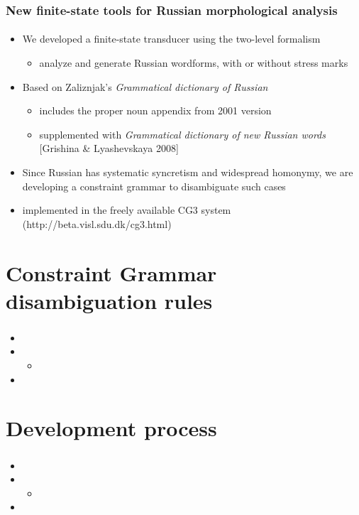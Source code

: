 \documentclass{beamer}
\begin{document}
\begin{frame}
\frametitle{New finite-state tools for Russian morphological analysis}
\framesubtitle{}
\begin{itemize}
	\item We developed a finite-state transducer using the two-level formalism \cite{Koskenniemi-84}
	\begin{itemize}	
		\item analyze and generate Russian wordforms, with or without stress marks
		\pause
	\end{itemize}
	\item Based on Zaliznjak's \emph{Grammatical dictionary of Russian} \cite{Zaliznjak-77}
	\begin{itemize}
		\item includes the proper noun appendix from 2001 version
		\item supplemented with \emph{Grammatical dictionary of new Russian words} [Grishina \& Lyashevskaya 2008]
		\pause
	\end{itemize}
	\item Since Russian has systematic syncretism and widespread homonymy, we are developing a constraint grammar \cite{Karlsson.Voutilainen.ea-95} to disambiguate such cases
	\pause
	\item implemented in the freely available CG3 system (http://beta.visl.sdu.dk/cg3.html)
\end{itemize}
\end{frame}

\section{Constraint Grammar disambiguation rules} %

\begin{frame}
\frametitle{}
\framesubtitle{}
\begin{itemize}
	\item 
	\pause
	\item 
	\begin{itemize}
		\item 
		\pause
	\end{itemize}
	\item 
\end{itemize}
\end{frame}


\section{Development process} %
\begin{frame}
\frametitle{}
\framesubtitle{}
\begin{itemize}
	\item 
	\pause
	\item 
	\begin{itemize}
		\item 
		\pause
	\end{itemize}
	\item 
\end{itemize}
\end{frame}
\end{document}
